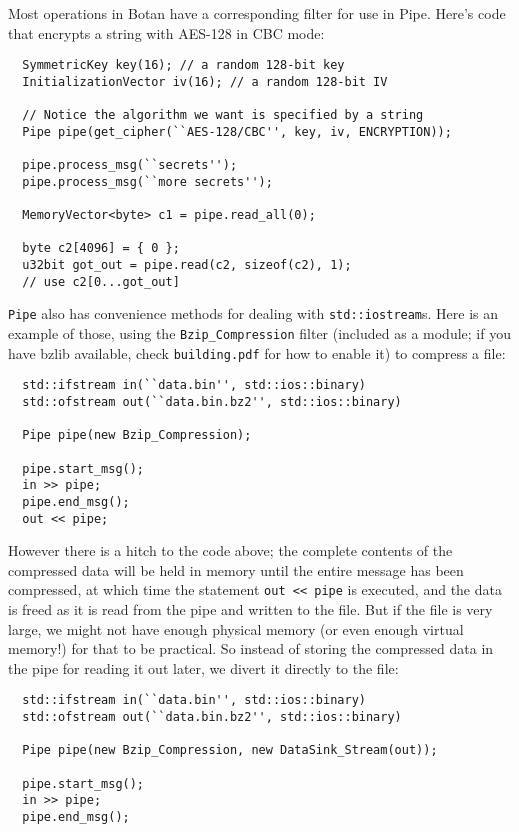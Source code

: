 \documentclass{article}
\newcommand{\filename}[1]{\texttt{#1}}
\newcommand{\type}[1]{\texttt{#1}}
\begin{document}
Most operations in Botan have a corresponding filter for use in Pipe.
Here's code that encrypts a string with AES-128 in CBC mode:

\begin{verbatim}
  SymmetricKey key(16); // a random 128-bit key
  InitializationVector iv(16); // a random 128-bit IV

  // Notice the algorithm we want is specified by a string
  Pipe pipe(get_cipher(``AES-128/CBC'', key, iv, ENCRYPTION));

  pipe.process_msg(``secrets'');
  pipe.process_msg(``more secrets'');

  MemoryVector<byte> c1 = pipe.read_all(0);

  byte c2[4096] = { 0 };
  u32bit got_out = pipe.read(c2, sizeof(c2), 1);
  // use c2[0...got_out]
\end{verbatim}

\type{Pipe} also has convenience methods for dealing with
\type{std::iostream}s. Here is an example of those, using
the \type{Bzip\_Compression} filter (included as a module;
if you have bzlib available, check \filename{building.pdf}
for how to enable it) to compress a file:

\begin{verbatim}
  std::ifstream in(``data.bin'', std::ios::binary)
  std::ofstream out(``data.bin.bz2'', std::ios::binary)

  Pipe pipe(new Bzip_Compression);

  pipe.start_msg();
  in >> pipe;
  pipe.end_msg();
  out << pipe;
\end{verbatim}

However there is a hitch to the code above; the complete contents of
the compressed data will be held in memory until the entire message
has been compressed, at which time the statement \verb|out << pipe| is
executed, and the data is freed as it is read from the pipe and
written to the file. But if the file is very large, we might not have
enough physical memory (or even enough virtual memory!) for that to be
practical. So instead of storing the compressed data in the pipe for
reading it out later, we divert it directly to the file:

\begin{verbatim}
  std::ifstream in(``data.bin'', std::ios::binary)
  std::ofstream out(``data.bin.bz2'', std::ios::binary)

  Pipe pipe(new Bzip_Compression, new DataSink_Stream(out));

  pipe.start_msg();
  in >> pipe;
  pipe.end_msg();
\end{verbatim}
\end{document}
